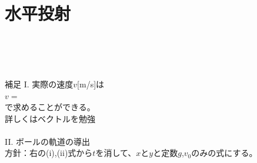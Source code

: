 \documentclass[11pt,twoside]{article}
\begin{document}
\clearpage
\section{水平投射}
	\begin{minipage}[t]{0.34\linewidth}
		\\\\\\
		\begin{itembox}[l]{補足}
			I. 実際の速度$v$[m/s]は\\\qquad
			\(
				v = 
			\)\\
			で求めることができる。\\
			\to 詳しくはベクトルを勉強\\\\
			II. ボールの軌道の導出\\
			\to 方針：右の(i),(ii)式から$t$を消して、$x$と$y$と定数$g$,$v_0$のみの式にする。\\\\\\\\\\\\\\
		\end{itembox}
	\end{minipage}
	\hfill
\end{document}

